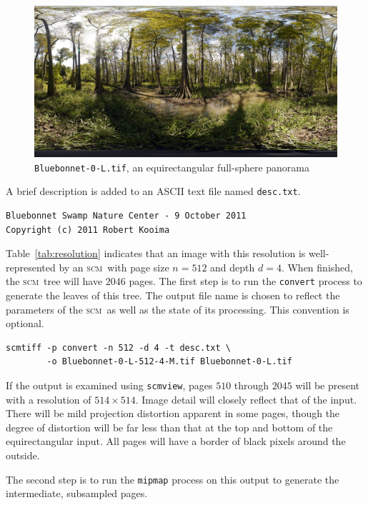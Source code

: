 \documentclass[oneside,10pt]{memoir}
\newcommand{\scm}     {\textsc{scm}}
\newcommand{\scmview} {\texttt{scmview}}
\begin{document}
\begin{Spacing}{1.1}
\begin{figure}
  \centering
  \includegraphics[width=\textwidth]{fig/bluebonnet.png}
  \caption{\texttt{Bluebonnet-0-L.tif}, an equirectangular full-sphere panorama}
  \label{fig:bluebonnet}
\end{figure}

A brief description is added to an ASCII text file named \texttt{desc.txt}.

\begin{Verbatim}
Bluebonnet Swamp Nature Center - 9 October 2011
Copyright (c) 2011 Robert Kooima
\end{Verbatim}

Table~\ref{tab:resolution} indicates that an image with this resolution is well-represented by an \scm\ with page size $n=512$ and depth $d=4$. When finished, the \scm\ tree will have $2046$ pages. The first step is to run the \texttt{convert} process to generate the leaves of this tree. The output file name is chosen to reflect the parameters of the \scm\ as well as the state of its processing. This convention is optional.

\begin{Verbatim}
scmtiff -p convert -n 512 -d 4 -t desc.txt \
        -o Bluebonnet-0-L-512-4-M.tif Bluebonnet-0-L.tif
\end{Verbatim}

If the output is examined using \scmview, pages $510$ through $2045$ will be present with a resolution of $514\times 514$. Image detail will closely reflect that of the input. There will be mild projection distortion apparent in some pages, though the degree of distortion will be far less than that at the top and bottom of the equirectangular input. All pages will have a border of black pixels around the outside.

The second step is to run the \texttt{mipmap} process on this output to generate the intermediate, subsampled pages.


\end{Spacing}
\end{document}
